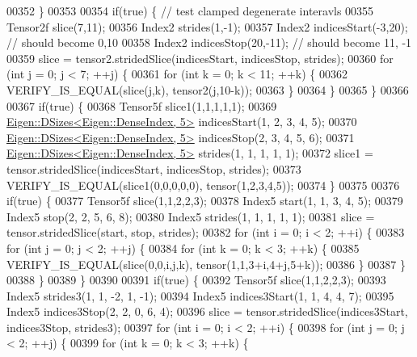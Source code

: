 \begin{DoxyCode}
00352   \}
00353 
00354   \textcolor{keywordflow}{if}(\textcolor{keyword}{true}) \{ \textcolor{comment}{// test clamped degenerate interavls}
00355     Tensor2f slice(7,11);
00356     Index2 strides(1,-1);
00357     Index2 indicesStart(-3,20); \textcolor{comment}{// should become 0,10}
00358     Index2 indicesStop(20,-11); \textcolor{comment}{// should become 11, -1}
00359     slice = tensor2.stridedSlice(indicesStart, indicesStop, strides);
00360     \textcolor{keywordflow}{for} (\textcolor{keywordtype}{int} j = 0; j < 7; ++j) \{
00361       \textcolor{keywordflow}{for} (\textcolor{keywordtype}{int} k = 0; k < 11; ++k) \{
00362         VERIFY\_IS\_EQUAL(slice(j,k), tensor2(j,10-k));
00363       \}
00364     \}
00365   \}
00366 
00367   \textcolor{keywordflow}{if}(\textcolor{keyword}{true}) \{
00368     Tensor5f slice1(1,1,1,1,1);
00369     \hyperlink{struct_eigen_1_1_d_sizes}{Eigen::DSizes<Eigen::DenseIndex, 5>} indicesStart(1, 2, 3, 4, 5);
00370     \hyperlink{struct_eigen_1_1_d_sizes}{Eigen::DSizes<Eigen::DenseIndex, 5>} indicesStop(2, 3, 4, 5, 6);
00371     \hyperlink{struct_eigen_1_1_d_sizes}{Eigen::DSizes<Eigen::DenseIndex, 5>} strides(1, 1, 1, 1, 1);
00372     slice1 = tensor.stridedSlice(indicesStart, indicesStop, strides);
00373     VERIFY\_IS\_EQUAL(slice1(0,0,0,0,0), tensor(1,2,3,4,5));
00374   \}
00375 
00376   \textcolor{keywordflow}{if}(\textcolor{keyword}{true}) \{
00377     Tensor5f slice(1,1,2,2,3);
00378     Index5 start(1, 1, 3, 4, 5);
00379     Index5 stop(2, 2, 5, 6, 8);
00380     Index5 strides(1, 1, 1, 1, 1);
00381     slice = tensor.stridedSlice(start, stop, strides);
00382     \textcolor{keywordflow}{for} (\textcolor{keywordtype}{int} i = 0; i < 2; ++i) \{
00383       \textcolor{keywordflow}{for} (\textcolor{keywordtype}{int} j = 0; j < 2; ++j) \{
00384         \textcolor{keywordflow}{for} (\textcolor{keywordtype}{int} k = 0; k < 3; ++k) \{
00385           VERIFY\_IS\_EQUAL(slice(0,0,i,j,k), tensor(1,1,3+i,4+j,5+k));
00386         \}
00387       \}
00388     \}
00389   \}
00390 
00391   \textcolor{keywordflow}{if}(\textcolor{keyword}{true}) \{
00392     Tensor5f slice(1,1,2,2,3);
00393     Index5 strides3(1, 1, -2, 1, -1);
00394     Index5 indices3Start(1, 1, 4, 4, 7);
00395     Index5 indices3Stop(2, 2, 0, 6, 4);
00396     slice = tensor.stridedSlice(indices3Start, indices3Stop, strides3);
00397     \textcolor{keywordflow}{for} (\textcolor{keywordtype}{int} i = 0; i < 2; ++i) \{
00398       \textcolor{keywordflow}{for} (\textcolor{keywordtype}{int} j = 0; j < 2; ++j) \{
00399         \textcolor{keywordflow}{for} (\textcolor{keywordtype}{int} k = 0; k < 3; ++k) \{

\end{DoxyCode}
